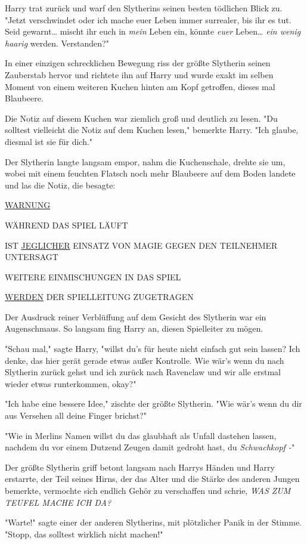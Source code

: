 {Harry trat zurück und warf den Slytherins seinen besten tödlichen Blick zu. "Jetzt verschwindet oder ich mache euer Leben immer surrealer, bis ihr es tut. Seid gewarnt… mischt ihr euch in \emph{mein} Leben ein, könnte \emph{euer} Leben… \emph{ein wenig haarig} werden. Verstanden?"

In einer einzigen schrecklichen Bewegung riss der größte Slytherin seinen Zauberstab hervor und richtete ihn auf Harry und wurde exakt im selben Moment von einem weiteren Kuchen hinten am Kopf getroffen, dieses mal Blaubeere.

Die Notiz auf diesem Kuchen war ziemlich groß und deutlich zu lesen. "Du solltest vielleicht die Notiz auf dem Kuchen lesen," bemerkte Harry. "Ich glaube, diesmal ist sie für dich."

Der Slytherin langte langsam empor, nahm die Kuchenschale, drehte sie um, wobei mit einem feuchten Flatsch noch mehr Blaubeere auf dem Boden landete und las die Notiz, die besagte:

\uline{WARNUNG}

WÄHREND DAS SPIEL LÄUFT

IST \uline{JEGLICHER} EINSATZ VON MAGIE GEGEN DEN TEILNEHMER UNTERSAGT

WEITERE EINMISCHUNGEN IN DAS SPIEL

\uline{WERDEN} DER SPIELLEITUNG ZUGETRAGEN

Der Ausdruck reiner Verblüffung auf dem Gesicht des Slytherin war ein Augenschmaus. So langsam fing Harry an, diesen Spielleiter zu mögen.

"Schau mal," sagte Harry, "willst du's für heute nicht einfach gut sein lassen? Ich denke, das hier gerät gerade etwas außer Kontrolle. Wie wär's wenn du nach Slytherin zurück gehst und ich zurück nach Ravenclaw und wir alle erstmal wieder etwas runterkommen, okay?"

"Ich habe eine bessere Idee," zischte der größte Slytherin. "Wie wär's wenn du dir aus Versehen all deine Finger brichst?"

"Wie in Merlins Namen willst du das glaubhaft als Unfall dastehen lassen, nachdem du vor einem Dutzend Zeugen damit gedroht hast, du \emph{Schwachkopf -}"

Der größte Slytherin griff betont langsam nach Harrys Händen und Harry erstarrte, der Teil seines Hirns, der das Alter und die Stärke des anderen Jungen bemerkte, vermochte sich endlich Gehör zu verschaffen und schrie, \emph{WAS ZUM TEUFEL MACHE ICH DA?}

"Warte!" sagte einer der anderen Slytherins, mit plötzlicher Panik in der Stimme. "Stopp, das solltest wirklich nicht machen!"

}
